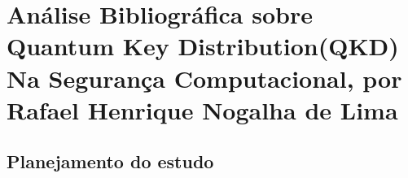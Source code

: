 \chapter{Análise Bibliográfica sobre Quantum Key Distribution(QKD) Na Segurança Computacional, por Rafael Henrique Nogalha de Lima}

\section{Planejamento do estudo}